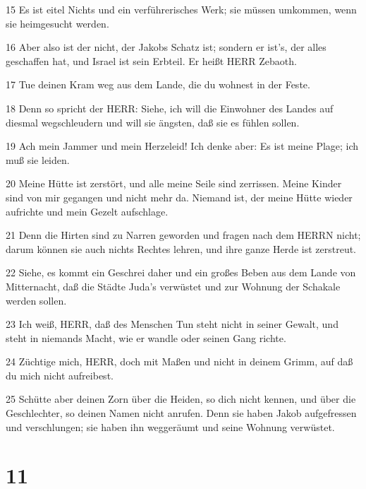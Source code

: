 \par 15 Es ist eitel Nichts und ein verführerisches Werk; sie müssen umkommen, wenn sie heimgesucht werden.
\par 16 Aber also ist der nicht, der Jakobs Schatz ist; sondern er ist's, der alles geschaffen hat, und Israel ist sein Erbteil. Er heißt HERR Zebaoth.
\par 17 Tue deinen Kram weg aus dem Lande, die du wohnest in der Feste.
\par 18 Denn so spricht der HERR: Siehe, ich will die Einwohner des Landes auf diesmal wegschleudern und will sie ängsten, daß sie es fühlen sollen.
\par 19 Ach mein Jammer und mein Herzeleid! Ich denke aber: Es ist meine Plage; ich muß sie leiden.
\par 20 Meine Hütte ist zerstört, und alle meine Seile sind zerrissen. Meine Kinder sind von mir gegangen und nicht mehr da. Niemand ist, der meine Hütte wieder aufrichte und mein Gezelt aufschlage.
\par 21 Denn die Hirten sind zu Narren geworden und fragen nach dem HERRN nicht; darum können sie auch nichts Rechtes lehren, und ihre ganze Herde ist zerstreut.
\par 22 Siehe, es kommt ein Geschrei daher und ein großes Beben aus dem Lande von Mitternacht, daß die Städte Juda's verwüstet und zur Wohnung der Schakale werden sollen.
\par 23 Ich weiß, HERR, daß des Menschen Tun steht nicht in seiner Gewalt, und steht in niemands Macht, wie er wandle oder seinen Gang richte.
\par 24 Züchtige mich, HERR, doch mit Maßen und nicht in deinem Grimm, auf daß du mich nicht aufreibest.
\par 25 Schütte aber deinen Zorn über die Heiden, so dich nicht kennen, und über die Geschlechter, so deinen Namen nicht anrufen. Denn sie haben Jakob aufgefressen und verschlungen; sie haben ihn weggeräumt und seine Wohnung verwüstet.

\chapter{11}

